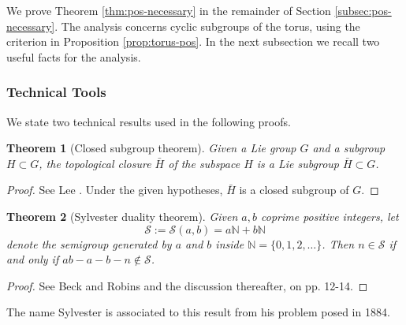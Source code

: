 \documentclass[11pt, letterpaper, reqno]{amsart}
\newtheorem{thm}{Theorem}[section]
\theoremstyle{definition}
\numberwithin{equation}{section}
\newcommand{\NN}{\mathbb{N}}
\newcommand{\sS}{{\mathcal{S}}}
\begin{document}
{ We prove Theorem \ref{thm:pos-necessary}
in the remainder of Section \ref{subsec:pos-necessary}. 
The analysis concerns cyclic subgroups of the torus, using the criterion in 
Proposition  \ref{prop:torus-pos}.
In the next subsection we recall two useful facts for the analysis.

%
%
\subsubsection{Technical Tools}\label{sec:621}
We state two technical results used in the following proofs.

\begin{thm}[Closed subgroup theorem]
\label{thm:lie-subgroup}
Given a Lie group $G$ and a subgroup $H\subset G$, 
the topological closure $\bar{H}$ of the subspace $H$ is a Lie subgroup $\bar{H}\subset G$.
\end{thm}
\begin{proof}
See  Lee \cite[Theorem 20.12, p. 523]{Lee13}.
Under the given hypotheses, $\bar{H}$ is a closed subgroup of $G$.
\end{proof}

\begin{thm}[Sylvester duality theorem]
\label{thm:sylvester}
Given $a,b$  coprime positive integers, let 
$$\sS := \sS(a, b) = a\NN + b\NN$$ 
denote the semigroup  generated by $a$ and $b$
inside $\NN = \{0, 1, 2, \ldots\}$.
Then $n\in \sS$ if and only if $ab - a - b - n\not\in \sS$.
\end{thm}
\begin{proof}
See  Beck and Robins \cite[Theorem 1.3, p. 6]{BeckR07} and the discussion thereafter, on pp. 12-14.
\end{proof}

\noindent The name Sylvester is associated to this result from his  problem
 \cite{Sylvester:1884}   posed in 1884.

}
\end{document}

